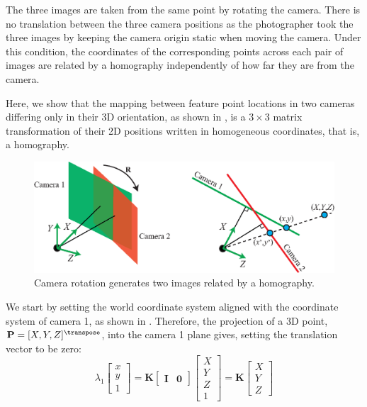 The three images are taken from the same point by rotating the camera. There is no translation between the three camera positions as the photographer took the three images by keeping the camera origin static when moving the camera. Under this condition, the coordinates of the corresponding points across each pair of images are related by a homography independently of how far they are from the camera.

Here, we show that the mapping between feature point locations in two cameras differing only in their 3D orientation, as shown in \fig{\ref{fig:rotation_homography}}, is a $3\times3$ matrix transformation of their 2D positions written in homogeneous coordinates, that is, a homography.


\begin{figure}[h!]
    \centerline{
        \includegraphics[width=1\linewidth]{figures/homography/rotation_homography_vs3.eps}
    }
    \caption{Camera rotation generates two images related by a homography.}
    \label{fig:rotation_homography}
\end{figure}

We start by setting the world coordinate system aligned with the coordinate system of camera 1, as shown in \fig{\ref{fig:rotation_homography}}.  Therefore, the projection of a 3D point, $\mathbf{P}=[X,Y,Z]^\transpose$, into the camera 1 plane gives, setting the translation vector to be zero:
\begin{equation}
    \lambda_1
    \begin{bmatrix}
        x \\
        y \\
        1
    \end{bmatrix}
    =
    \mathbf{K}
    \begin{bmatrix}
        \mathbf{I} & \mathbf{0}
    \end{bmatrix}
    \begin{bmatrix}
        X \\
        Y \\
        Z \\
        1
    \end{bmatrix}
    =
    \mathbf{K}
    \begin{bmatrix}
        X \\
        Y \\
        Z
    \end{bmatrix}
    \label{eq:projectionintofirstcamera}
\end{equation}

